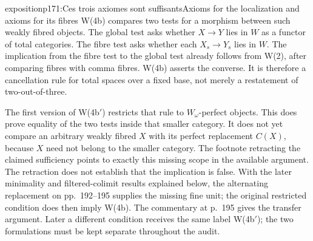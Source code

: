 \begin{dcomment}{exposition}{p171:Ces trois axiomes sont suffisants}{Axioms for the localization and axioms for its fibres}
W(4b) compares two tests for a morphism between such weakly fibred objects. The global test asks whether $X\to Y$ lies in $W$ as a functor of total categories. The fibre test asks whether each $X_s\to Y_s$ lies in $W$. The implication from the fibre test to the global test already follows from W(2), after comparing fibres with comma fibres. W(4b) asserts the converse. It is therefore a cancellation rule for total spaces over a fixed base, not merely a restatement of two-out-of-three.

The first version of W(4b$'$) restricts that rule to $W_\omega$-perfect objects. This does prove equality of the two tests inside that smaller category. It does not yet compare an arbitrary weakly fibred $X$ with its perfect replacement $C(X)$, because $X$ need not belong to the smaller category. The footnote retracting the claimed sufficiency points to exactly this missing scope in the available argument. The retraction does not establish that the implication is false. With the later minimality and filtered-colimit results explained below, the alternating replacement on pp.~192--195 supplies the missing fine unit; the original restricted condition does then imply W(4b). The commentary at p.~195 gives the transfer argument. Later a different condition receives the same label W(4b$'$); the two formulations must be kept separate throughout the audit.
\end{dcomment}


